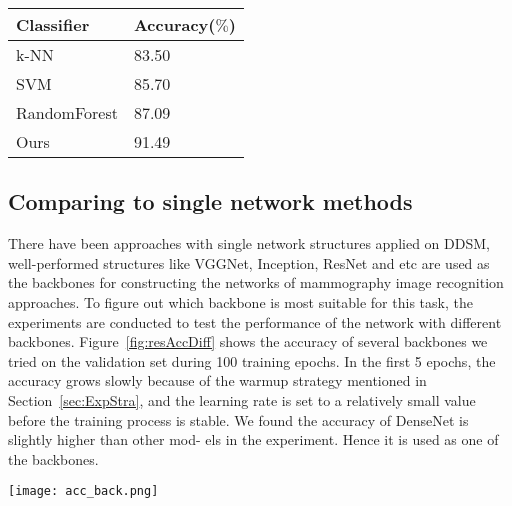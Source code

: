 \begin{table*}[!ht]
    \caption{Comparison results of the 
        classifers}
    \label{tab:tabCls}
    \setlength{\arrayrulewidth}{1.05 pt}
    \renewcommand{\arraystretch}{1.1}
    \begin{tabular*}{1.0\textwidth}{
        @{
            \extracolsep{\fill}
        }ll
    }
        \hline
        
        Classifier & Accuracy($\%$) \\
                
        \hline

        k-NN            & 83.50 \\ 
        SVM             & 85.70 \\ 
        RandomForest    & 87.09 \\ 
        Ours            & 91.49 \\
        
        \hline
    \end{tabular*}
\end{table*}

\subsection{Comparing to single network methods}
\label{ExpCS}

There have been approaches with single 
network structures applied on DDSM,
well-performed structures like VGGNet, 
Inception, ResNet and etc are used as 
the backbones for constructing the networks 
of mammography image recognition approaches. 
To figure out which backbone is most suitable
for this task, the experiments are conducted 
to test the performance of the network with 
different backbones. 
Figure~\ref{fig:resAccDiff} shows the 
accuracy of several backbones we tried on the 
validation set during 100 training epochs. 
In the first 5 epochs, the accuracy grows 
slowly because of the warmup strategy 
mentioned in Section~\ref{sec:ExpStra}, 
and the learning rate is set to a 
relatively small value before the training 
process is stable. We found the accuracy of 
DenseNet is slightly higher than other mod-
els in the experiment. Hence it is used as 
one of the backbones.

\begin{figure*}[!ht]
    \centering
    \texttt{[image: acc\_back.png]}
    \caption{Validation accuracy of different 
        backbone.}
    \label{fig:resAccDiff}
\end{figure*} 

